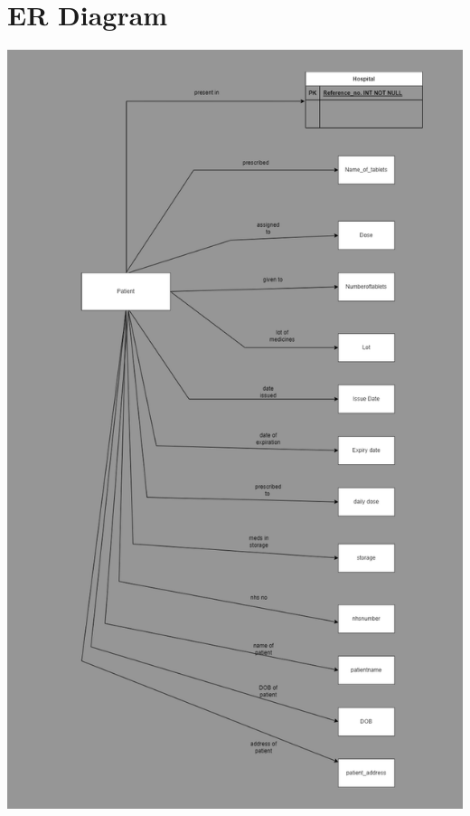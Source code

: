 \documentclass{article}
\begin{document}
\section{\textbf{ER Diagram}}
\begin{center}
    \includegraphics[scale = 0.8]{ERDiagram.png}
\end{center}
\end{document}
